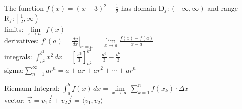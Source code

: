 \documentclass[11pt]{article}
\begin{document}
The function $f(x)=(x-3)^2+\frac{1}{2}$ has domain $\mathrm{D}_f:(-\infty,\infty)$ and range $\mathrm{R}_f:\left[\frac{1}{2},\infty\right)$\\

limits: $\lim\limits_{x \to a^-}f(x)$\\

derivatives: $f'(a)=\displaystyle{\left.\frac{dy}{dx}\right|_{x=a}=
\lim\limits_{x \to a}\frac{f(x)-f(a)}{x-a}}$\\

integrals: $\displaystyle{\int_{a^2}^{b^2} x^2\,dx=\left[\frac{x^3}{3}\right]_{a^2}^{b^2}=\frac{a^6}{3}-\frac{b^6}{3}}$\\

sigma:$\displaystyle{\sum\limits_{n=1}^{\infty}ar^n=a+ar+ar^2+\cdots+ar^n}$

Riemann Integral: $\displaystyle{
\int_{a}^{b}f(x)\,dx=
\lim\limits_{x \to \infty}\sum\limits_{k=1}^{n}
f(x_k)\cdot\Delta x}$\\

vector: $\vec{v}=v_1\vec{i}+v_2\vec{j}=\langle v_1,v_2\rangle$
\end{document}
